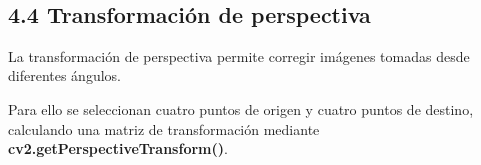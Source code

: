\documentclass[11pt]{article}
\begin{document}
    \begin{center}
    \end{center}
    { \hspace*{\fill} \\}
    
    \subsection{4.4 Transformación de
perspectiva}\label{transformaciuxf3n-de-perspectiva}

La transformación de perspectiva permite corregir imágenes tomadas desde
diferentes ángulos.

Para ello se seleccionan cuatro puntos de origen y cuatro puntos de
destino, calculando una matriz de transformación mediante
\textbf{cv2.getPerspectiveTransform()}.
\end{document}
